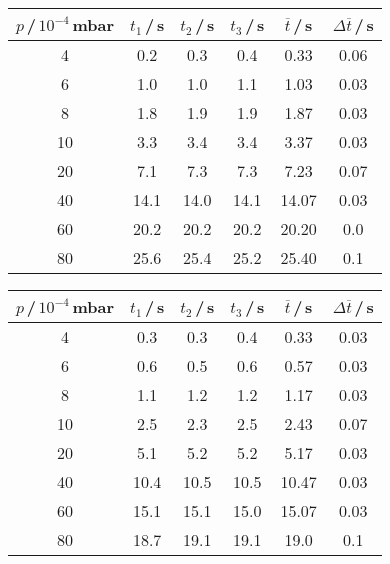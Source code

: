 \begin{table}[H]
  \vspace{1cm}

  \begin{subtable}{0.49\textwidth}
    \hspace{-1.5cm}
    \begin{tabular}{c|c|c|c|c|c}\label{tab:Leck15Turbo}
      $p$\,/\,$10^{-4}$\,mbar & $t_1$\,/\,s & $t_2$\,/\,s & $t_3$\,/\,s & $\overline{t}$\,/\,s & $\Delta\overline{t}$\,/\,s \\
      \midrule
      4  & 0.2  & 0.3  & 0.4  & 0.33  & 0.06 \\
      6  & 1.0  & 1.0  & 1.1  & 1.03  & 0.03 \\
      8  & 1.8  & 1.9  & 1.9  & 1.87  & 0.03 \\
      10 & 3.3  & 3.4  & 3.4  & 3.37  & 0.03 \\
      20 & 7.1  & 7.3  & 7.3  & 7.23  & 0.07 \\
      40 & 14.1 & 14.0 & 14.1 & 14.07 & 0.03 \\
      60 & 20.2 & 20.2 & 20.2 & 20.20 & 0.0  \\
      80 & 25.6 & 25.4 & 25.2 & 25.40 & 0.1  \\
    \end{tabular}
  \end{subtable}\hspace{2cm}
  \begin{subtable}{0.49\textwidth}
    \hspace{-1.4cm}
    \begin{tabular}{c|c|c|c|c|c}\label{tab:Leck20Turbo}
      $p$\,/\,$10^{-4}$\,mbar & $t_1$\,/\,s & $t_2$\,/\,s & $t_3$\,/\,s & $\overline{t}$\,/\,s & $\Delta\overline{t}$\,/\,s \\
      \midrule
      4  & 0.3  & 0.3  & 0.4  & 0.33  & 0.03 \\
      6  & 0.6  & 0.5  & 0.6  & 0.57  & 0.03 \\
      8  & 1.1  & 1.2  & 1.2  & 1.17  & 0.03 \\
      10 & 2.5  & 2.3  & 2.5  & 2.43  & 0.07 \\
      20 & 5.1  & 5.2  & 5.2  & 5.17  & 0.03 \\
      40 & 10.4 & 10.5 & 10.5 & 10.47 & 0.03 \\
      60 & 15.1 & 15.1 & 15.0 & 15.07 & 0.03 \\
      80 & 18.7 & 19.1 & 19.1 & 19.0  & 0.1  \\
    \end{tabular}
  \end{subtable}
\end{table}

